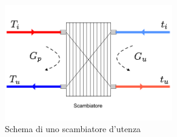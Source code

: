 \documentclass[laurea,oneside,11pt]{USiena_tesiLM}
\begin{document}
\begin{figure}[h]
\begin{center}
\includegraphics[width=0.65\textwidth]{figure/scambiatore} %
\caption{Schema di uno scambiatore d'utenza}
\label{fig:scamb}
\end{center}
\end{figure}
\end{document}
